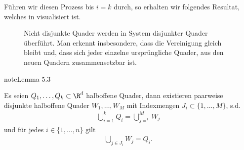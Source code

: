 \documentclass[letterpaper,10pt,english]{jupyterBook}
\let\sphinxpxdimen\pdfpxdimen\else\newdimen\sphinxpxdimen
\begin{document}
\sphinxAtStartPar
Führen wir diesen Prozess bis \(i=k\) durch, so erhalten wir folgendes Resultat, welches in  visualisiert ist.

\begin{figure}[htbp]
\centering
\capstart

\noindent\sphinxincludegraphics[width=400\sphinxpxdimen]{{DisRect}.jpg}
\caption{Nicht disjunkte Quader werden in System disjunkter Quader überführt. Man erkennt insbesondere, dass die Vereinigung gleich bleibt und, dass sich jeder einzelne ursprüngliche Quader, aus den neuen Quadern zusammensetzbar ist.}\label{\detokenize{masstheorie/masstheorie:fig-disrect}}\end{figure}
\label{masstheorie/masstheorie:lem:disRect}
\begin{sphinxadmonition}{note}{Lemma 5.3}



\sphinxAtStartPar
Es seien \(Q_1,\ldots,Q_k\subset\R^d\) halboffene Quader, dann existieren paarweise disjunkte halboffene Quader \(W_1,\ldots, W_M\) mit Indexmengen \(J_i\subset\{1,\ldots,M\}\), s.d.
\begin{equation*}
\begin{split}\bigcup_{i=1}^k Q_i = \bigcup_{j=^1}^M W_j\end{split}
\end{equation*}
\sphinxAtStartPar
und für jedes \(i\in\{1,\ldots,n\}\) gilt
\begin{equation*}
\begin{split}\bigcup_{j\in J_i} W_j = Q_i.\end{split}
\end{equation*}\end{sphinxadmonition}
\end{document}
